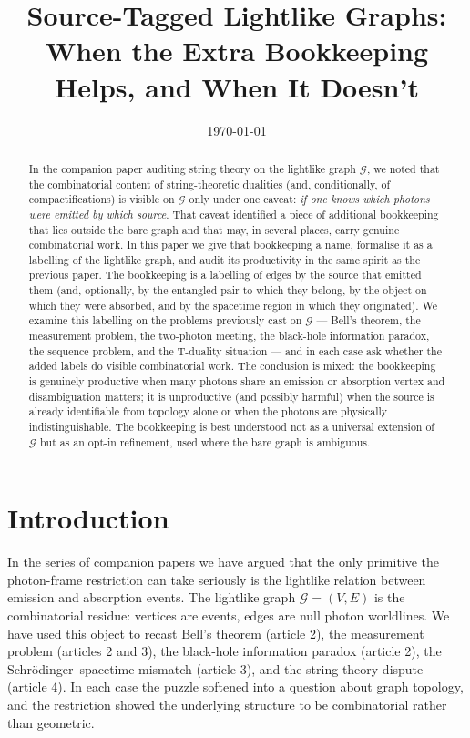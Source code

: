 \documentclass[11pt]{article}
\title{Source-Tagged Lightlike Graphs:\\
When the Extra Bookkeeping Helps, and When It Doesn't}
\date{\today}
\begin{document}
\maketitle

\begin{abstract}
In the companion paper auditing string theory on the lightlike graph $\mathcal{G}$, we noted that the combinatorial content of string-theoretic dualities (and, conditionally, of compactifications) is visible on $\mathcal{G}$ only under one caveat: \emph{if one knows which photons were emitted by which source}. That caveat identified a piece of additional bookkeeping that lies outside the bare graph and that may, in several places, carry genuine combinatorial work. In this paper we give that bookkeeping a name, formalise it as a labelling of the lightlike graph, and audit its productivity in the same spirit as the previous paper. The bookkeeping is a labelling of edges by the source that emitted them (and, optionally, by the entangled pair to which they belong, by the object on which they were absorbed, and by the spacetime region in which they originated). We examine this labelling on the problems previously cast on $\mathcal{G}$ --- Bell's theorem, the measurement problem, the two-photon meeting, the black-hole information paradox, the sequence problem, and the T-duality situation --- and in each case ask whether the added labels do visible combinatorial work. The conclusion is mixed: the bookkeeping is genuinely productive when many photons share an emission or absorption vertex and disambiguation matters; it is unproductive (and possibly harmful) when the source is already identifiable from topology alone or when the photons are physically indistinguishable. The bookkeeping is best understood not as a universal extension of $\mathcal{G}$ but as an opt-in refinement, used where the bare graph is ambiguous.
\end{abstract}

\section{Introduction}

In the series of companion papers we have argued that the only primitive the photon-frame restriction can take seriously is the lightlike relation between emission and absorption events. The lightlike graph $\mathcal{G} = (V, E)$ is the combinatorial residue: vertices are events, edges are null photon worldlines. We have used this object to recast Bell's theorem (article 2), the measurement problem (articles 2 and 3), the black-hole information paradox (article 2), the Schr\"odinger--spacetime mismatch (article 3), and the string-theory dispute (article 4). In each case the puzzle softened into a question about graph topology, and the restriction showed the underlying structure to be combinatorial rather than geometric.
\end{document}
